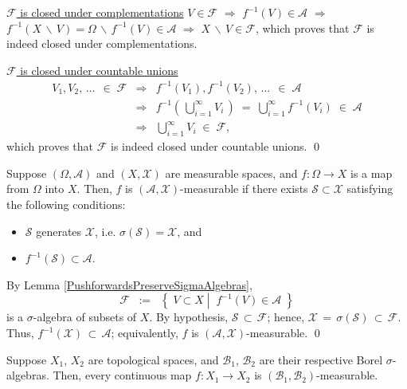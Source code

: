 \vskip 0.5cm
\noindent
\underline{$\mathcal{F}$ is closed under complementations}\quad
$V \in \mathcal{F}$
\;$\Longrightarrow$\; $f^{-1}(V)\in\mathcal{A}$
\;$\Longrightarrow$\; $f^{-1}(X\,\backslash\,V) = \Omega\,\backslash\,f^{-1}(V) \in \mathcal{A}$
\;$\Longrightarrow$\; $X\,\backslash\,V \in \mathcal{F}$,
which proves that $\mathcal{F}$ is indeed closed under complementations. 

\vskip 0.5cm
\noindent
\underline{$\mathcal{F}$ is closed under countable unions}\quad
\begin{eqnarray*}
V_{1}, V_{2}, \,\ldots\, \;\in\; \mathcal{F}
&\Longrightarrow&
	f^{-1}(V_{1}), f^{-1}(V_{2}), \,\ldots\, \;\in\; \mathcal{A}
\\
&\Longrightarrow&
	f^{-1}\!\left(\,\bigcup_{i=1}^{\infty}V_{i}\,\right) \;=\; \bigcup_{i=1}^{\infty}f^{-1}\!\left(V_{i}\right) \;\in\; \mathcal{A}
\\
&\Longrightarrow&
	\bigcup_{i=1}^{\infty}V_{i} \;\in\; \mathcal{F},
\end{eqnarray*}
which proves that $\mathcal{F}$ is indeed closed under countable unions.
\qed

\begin{theorem}
\mbox{}\vskip 0.1cm
\noindent
Suppose $(\Omega,\mathcal{A})$ and $(X,\mathcal{X})$
are measurable spaces, and $f : \Omega \longrightarrow X$
is a map from $\Omega$ into $X$. Then,
$f$ is $(\mathcal{A},\mathcal{X})$-measurable
if there exists $\mathcal{S} \subset \mathcal{X}$
satisfying the following conditions:
\begin{itemize}
\item	$\mathcal{S}$ generates $\mathcal{X}$, i.e. $\sigma(\mathcal{S}) = \mathcal{X}$, and
\item	$f^{-1}\!\left(\mathcal{S}\right) \subset \mathcal{A}$.
\end{itemize}
\end{theorem}
\proof
By Lemma \ref{PushforwardsPreserveSigmaAlgebras},
\begin{equation*}
\mathcal{F}
\;\; := \;\;
\left\{\;
V \subset X
\;\left\vert\;\;
f^{-1}\left(V\right) \in \mathcal{A}
\right.
\;\right\}
\end{equation*}
is a $\sigma$-algebra of subsets of $X$.
By hypothesis, $\mathcal{S} \,\subset\, \mathcal{F}$;
hence, $\mathcal{X} \,=\, \sigma(\mathcal{S}) \,\subset\, \mathcal{F}$.
Thus, $f^{-1}(\mathcal{X}) \,\subset\, \mathcal{A}$;
equivalently, $f$ is $\left(\mathcal{A},\mathcal{X}\right)$-measurable.
\qed

\begin{corollary}
\label{ContinuousMapsAreBorelMeasurable}
\mbox{}\vskip 0.1cm
\noindent
Suppose $X_{1}$, $X_{2}$ are topological spaces, and
$\mathcal{B}_{1}$, $\mathcal{B}_{2}$ are their respective Borel $\sigma$-algebras.
Then, every continuous map $f : X_{1} \longrightarrow X_{2}$ is
$\left(\mathcal{B}_{1},\mathcal{B}_{2}\right)$-measurable.
\end{corollary}

